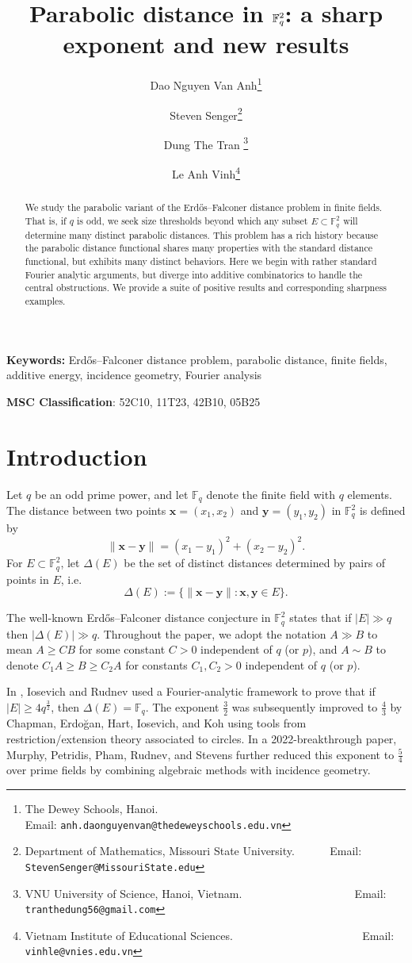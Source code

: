 \documentclass{article}
\title{Parabolic distance in $\F_q^2$: a sharp exponent and new results}
\author{Dao Nguyen Van Anh\thanks{The Dewey Schools, Hanoi. ~~~~~~~~~~~~~~~~~~~~~~~~~~~~~~~~~~~~~~~~~~ Email: {\tt anh.daonguyenvan@thedeweyschools.edu.vn}}  \and Steven Senger\thanks{Department of Mathematics, Missouri State University. ~~~~~ Email: {\tt StevenSenger@MissouriState.edu}} \and Dung The Tran \thanks{VNU University of Science, Hanoi, Vietnam. ~~~~~~~~~~~~~~~~~~~ Email: {\tt tranthedung56@gmail.com}} \and Le Anh Vinh\thanks{Vietnam Institute of Educational Sciences. ~~~~~~~~~~~~~~~~~~~~~~ Email: {\tt vinhle@vnies.edu.vn}}}
\date{}
\newcommand{\F}{\mathbb{F}}
\newcommand{\1}{\mathbf{1}}
\begin{document}
\maketitle

\begin{abstract}
We study the parabolic variant of the Erd\H os--Falconer distance problem in finite fields. That is, if $q$ is odd, we seek size thresholds beyond which any subset $E\subset \mathbb F_q^2$ will determine many distinct parabolic distances. This problem has a rich history because the parabolic distance functional shares many properties with the standard distance functional, but exhibits many distinct behaviors. Here we begin with rather standard Fourier analytic arguments, but diverge into additive combinatorics to handle the central obstructions. We provide a suite of positive results and corresponding sharpness examples.
\end{abstract}


\textbf{Keywords:} Erd\H os--Falconer distance problem, parabolic distance, finite fields, additive energy, incidence geometry, Fourier analysis

\textbf{MSC Classification}: 52C10, 11T23, 42B10, 05B25


\tableofcontents


\section{Introduction}
Let $q$ be an odd prime power, and let $\F_q$ denote the finite field with $q$ elements. The distance between two points $\mathbf{x}=(x_1, x_2)$ and $\mathbf{y}=(y_1, y_2)$ in $\mathbb{F}_q^2$ is defined by 
\[\|\mathbf{x}-\mathbf{y}\|=(x_1-y_1)^2+(x_2-y_2)^2.\]
For $E\subset \mathbb{F}_q^2$, let $\Delta(E)$ be the set of distinct distances determined by pairs of points in $E$, i.e. 
\[\Delta(E):=\{\|\mathbf{x}-\mathbf{y}\|\colon \mathbf{x}, \mathbf{y}\in E\}.\]

The well-known Erd\H{o}s--Falconer distance conjecture in $\mathbb{F}_q^2$ states that if $|E|\gg q$ then $|\Delta(E)|\gg q$. Throughout the paper, we adopt the notation $A\gg B$ to mean $A \ge C B$ for some constant $C>0$ independent of $q$ (or $p$), and $A\sim B$ to denote $C_1 A \ge B \ge C_2 A$ for constants $C_1, C_2>0$ independent of $q$ (or $p$).

In \cite{IR07}, Iosevich and Rudnev used a Fourier-analytic framework to prove that if $|E|\ge 4q^{ \frac{3}{2}}$, then $\Delta(E)=\mathbb{F}_q$. The exponent $\frac{3}{2}$ was subsequently improved to $\frac{4}{3}$ by Chapman, Erdo\u{g}an, Hart, Iosevich, and Koh \cite{CEHIK12} using tools from restriction/extension theory associated to circles. In a 2022-breakthrough paper, Murphy, Petridis, Pham, Rudnev, and Stevens \cite{MPPRS22} further reduced this exponent to $\frac{5}{4}$ over prime fields by combining algebraic methods with incidence geometry.
\end{document}
